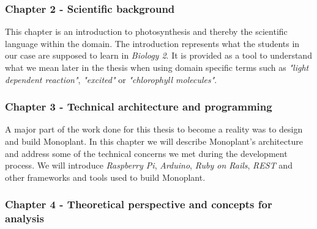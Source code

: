 \subsubsection*{Chapter 2 - Scientific background}
This chapter is an introduction to photosynthesis and thereby the scientific language within the domain. The introduction represents what the students in our case are supposed to learn in \emph{Biology 2}. It is provided as a tool to understand what we mean later in the thesis when using domain specific terms such as \emph{"light dependent reaction"}, \emph{"excited"} or \emph{"chlorophyll molecules"}.

\subsubsection*{Chapter 3 - Technical architecture and programming}
A major part of the work done for this thesis to become a reality was to design and build Monoplant. In this chapter we will describe Monoplant's architecture and address some of the technical concerns we met during the development process. We will introduce \emph{Raspberry Pi}, \emph{Arduino}, \emph{Ruby on Rails}, \emph{REST} and other frameworks and tools used to build Monoplant.

\subsubsection*{Chapter 4 - Theoretical perspective and concepts for analysis}


